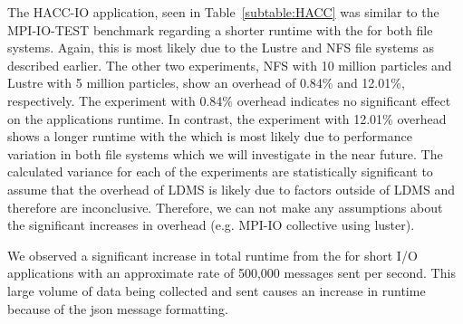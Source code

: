 
The HACC-IO application, seen in Table~\ref{subtable:HACC} was similar to the MPI-IO-TEST benchmark regarding a shorter runtime with the \connector{} for both file systems. Again, this is most likely due to the Lustre and NFS file systems as described earlier. The other two experiments, NFS with 10 million particles and Lustre with 5 million particles, show an overhead of 0.84\% and 12.01\%, respectively. The experiment with 0.84\% overhead indicates no significant effect on the applications runtime. In contrast, the experiment with 12.01\% overhead shows a longer runtime with the \connector{} which is most likely due to performance variation in both file systems which we will investigate in the near future. The calculated variance for each of the experiments are statistically significant to assume that the overhead of LDMS is likely due to factors outside of LDMS and therefore are inconclusive. Therefore, we can not make any assumptions about the significant increases in overhead (e.g. MPI-IO collective using luster).

We observed a significant increase in total runtime from the \connector{} for short I/O applications with an approximate rate of 500,000 messages sent per second. This large volume of data being collected and sent causes an increase in runtime because of the json message formatting. 

